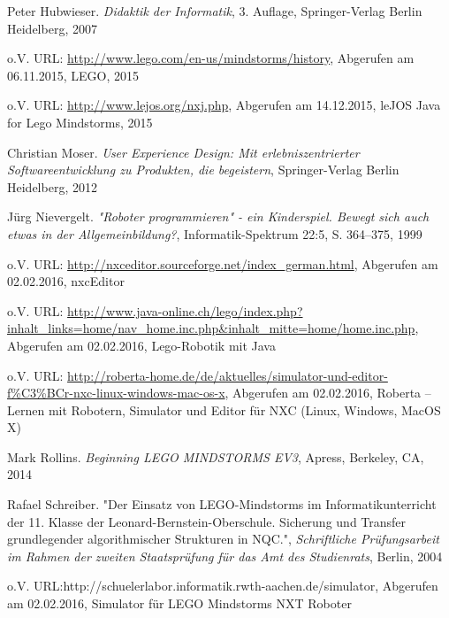 \begin{thebibliography}{ABCDEF}
Peter Hubwieser. \emph{Didaktik der Informatik}, 3. Auflage, Springer-Verlag Berlin Heidelberg, 2007


o.V. URL: \url{http://www.lego.com/en-us/mindstorms/history}, Abgerufen am 06.11.2015, LEGO, 2015

o.V. URL: \url{http://www.lejos.org/nxj.php}, Abgerufen am 14.12.2015, leJOS Java for Lego Mindstorms, 2015

Christian Moser. \emph{User Experience Design: Mit erlebniszentrierter Softwareentwicklung zu Produkten, die begeistern}, Springer-Verlag Berlin Heidelberg, 2012

Jürg Nievergelt. \emph{"Roboter programmieren" - ein Kinderspiel. Bewegt sich auch etwas in der Allgemeinbildung?}, Informatik-Spektrum 22:5, S. 364--375, 1999

o.V. URL: \url{http://nxceditor.sourceforge.net/index_german.html}, Abgerufen am 02.02.2016, nxcEditor

o.V. URL: \url{http://www.java-online.ch/lego/index.php?inhalt_links=home/nav_home.inc.php&inhalt_mitte=home/home.inc.php}, Abgerufen am 02.02.2016, Lego-Robotik mit Java 

o.V. URL: \url{http://roberta-home.de/de/aktuelles/simulator-und-editor-f%C3%BCr-nxc-linux-windows-mac-os-x}, Abgerufen am 02.02.2016, Roberta -- Lernen mit Robotern, Simulator und Editor für NXC (Linux, Windows, MacOS X)

Mark Rollins. \emph{Beginning LEGO MINDSTORMS EV3}, Apress, Berkeley, CA, 2014

Rafael Schreiber. "Der Einsatz von LEGO-Mindstorms im Informatikunterricht der 11. Klasse der Leonard-Bernstein-Oberschule. Sicherung und Transfer grundlegender algorithmischer Strukturen in NQC.", \emph{Schriftliche Prüfungsarbeit im Rahmen der zweiten Staatsprüfung für das Amt des Studienrats}, Berlin, 2004

o.V. URL:{http://schuelerlabor.informatik.rwth-aachen.de/simulator}, Abgerufen am 02.02.2016, Simulator für LEGO Mindstorms NXT Roboter


\end{thebibliography}
